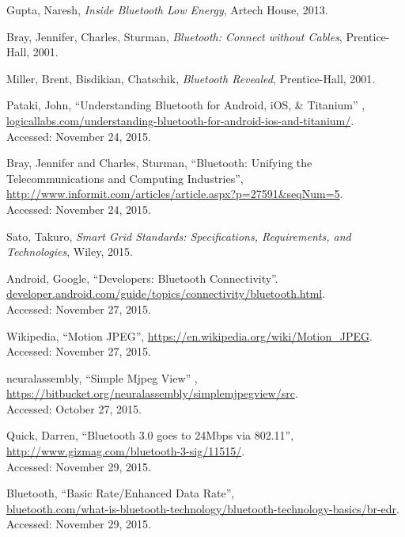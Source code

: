 \documentclass[a4paper,12pt]{article}
\begin{document}
\newpage
\begin{thebibliography}{9}
Gupta, Naresh, \textit{Inside Bluetooth Low Energy}, Artech House, 2013.

Bray, Jennifer, Charles, Sturman, \textit{Bluetooth: Connect without Cables}, Prentice-Hall, 2001.

Miller, Brent, Bisdikian, Chatschik, \textit{Bluetooth Revealed}, Prentice-Hall, 2001.

Pataki, John, “Understanding Bluetooth for Android, iOS, \& Titanium” ,\\\url{logicallabs.com/understanding-bluetooth-for-android-ios-and-titanium/}.\\ Accessed: November 24, 2015.

Bray, Jennifer and Charles, Sturman, “Bluetooth: Unifying the Telecommunications and Computing Industries”,\\ \url{http://www.informit.com/articles/article.aspx?p=27591&seqNum=5}.\\ Accessed: November 24, 2015.

Sato, Takuro, \textit{Smart Grid Standards: Specifications, Requirements, and Technologies}, Wiley, 2015.

Android, Google, “Developers: Bluetooth Connectivity”. \\
\url{developer.android.com/guide/topics/connectivity/bluetooth.html}.\\ Accessed: November 27, 2015.

Wikipedia, “Motion JPEG”, \url{https://en.wikipedia.org/wiki/Motion_JPEG}.\\ Accessed: November 27, 2015.

neuralassembly, “Simple Mjpeg View” , \url{https://bitbucket.org/neuralassembly/simplemjpegview/src}.\\ Accessed: October 27, 2015.

Quick, Darren, “Bluetooth 3.0 goes to 24Mbps via 802.11”, \\\url{http://www.gizmag.com/bluetooth-3-sig/11515/}. \\Accessed: November 29, 2015.

Bluetooth, “Basic Rate/Enhanced Data Rate”, \\ \url{bluetooth.com/what-is-bluetooth-technology/bluetooth-technology-basics/br-edr}. \\ Accessed: November 29, 2015.


\end{thebibliography}
\end{document}
